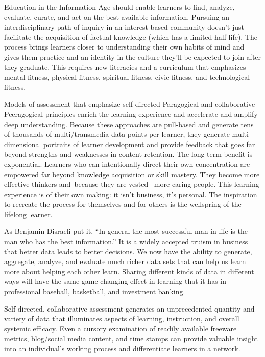 Education in the Information Age should enable learners to find,
analyze, evaluate, curate, and act on the best available information.
Pursuing an interdisciplinary path of inquiry in an interest-based
community doesn't just facilitate the acquisition of factual knowledge
(which has a limited half-life). The process brings learners closer to
understanding their own habits of mind and gives them practice and an
identity in the culture they'll be expected to join after they graduate.
This requires new literacies and a curriculum that emphasizes mental
fitness, physical fitness, spiritual fitness, civic fitness, and
technological fitness.

Models of assessment that emphasize self-directed Paragogical and
collaborative Peeragogical principles enrich the learning experience and
accelerate and amplify deep understanding. Because these approaches are
pull-based and generate tens of thousands of multi/transmedia data
points per learner, they generate multi-dimensional portraits of learner
development and provide feedback that goes far beyond strengths and
weaknesses in content retention. The long-term benefit is exponential.
Learners who can intentionally direct their own concentration are
empowered far beyond knowledge acquisition or skill mastery. They become
more effective thinkers and--because they are vested-- more caring
people. This learning experience is of their own making: it isn't
business, it's personal. The inspiration to recreate the process for
themselves and for others is the wellspring of the lifelong learner.

As Benjamin Disraeli put it, ``In general the most successful man in
life is the man who has the best information.'' It is a widely accepted
truism in business that better data leads to better decisions. We now
have the ability to generate, aggregate, analyze, and evaluate much
richer data sets that can help us learn more about helping each other
learn. Sharing different kinds of data in different ways will have the
same game-changing effect in learning that it has in professional
baseball, basketball, and investment banking.

Self-directed, collaborative assessment generates an unprecedented
quantity and variety of data that illuminates aspects of learning,
instruction, and overall systemic efficacy. Even a cursory examination
of readily available freeware metrics, blog/social media content, and
time stamps can provide valuable insight into an individual's working
process and differentiate learners in a network.

